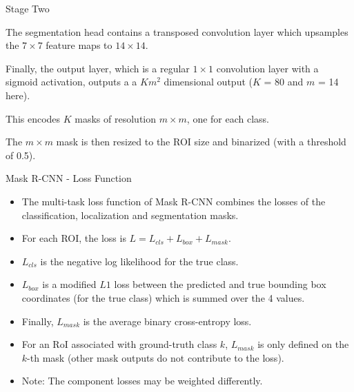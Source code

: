 \begin{frame} {Stage Two}
  \begin{figure}
    \centering
  \end{figure}
  \begin{itemize}
    \item \small{The segmentation head contains a transposed convolution layer which upsamples the $7 \times 7$ feature maps to $14 \times 14$.
    \item Finally, the output layer, which is a regular $1 \times 1$ convolution layer with a sigmoid activation, outputs a a $Km^2$ dimensional output ($K$ = 80 and $m$ = 14 here).
    \item This encodes $K$ masks of resolution $m \times m$, one for each class.
    \item The $m \times m$ mask is then resized to the ROI size and binarized (with a threshold of 0.5).}
  \end{itemize}
\end{frame}

\begin{frame} {Mask R-CNN - Loss Function}
  \begin{itemize}
    \item The multi-task loss function of Mask R-CNN combines the losses of the classification, localization and segmentation masks.
    \item For each ROI, the loss is $L = L_{cls} + L_{box} + L_{mask}$.
    \item $L_{cls}$ is the negative log likelihood for the true class.
    \item $L_{box}$ is a modified $L1$ loss between the predicted and true bounding box coordinates (for the true class) which is summed over the 4 values.
    \item Finally, $L_{mask}$ is the average binary cross-entropy loss.
    \item For an RoI associated with ground-truth class $k$, $L_{mask}$ is only defined on the $k$-th mask (other mask outputs do not contribute to the loss).
    \item Note: The component losses may be weighted differently.
  \end{itemize}
\end{frame}

